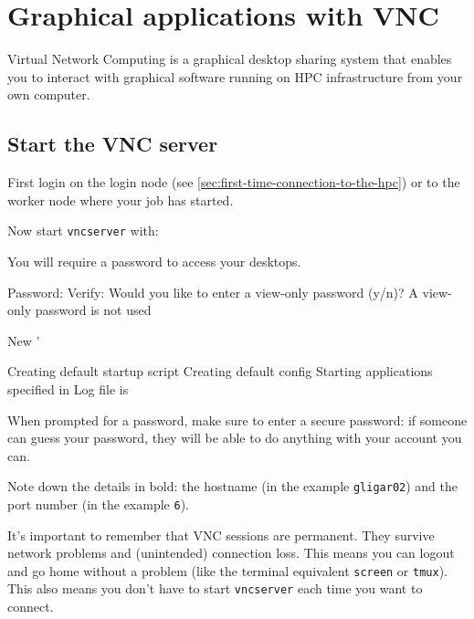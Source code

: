 \chapter{Graphical applications with VNC}
\label{ch:vnc}

Virtual Network Computing is a graphical desktop sharing system that enables you
to interact with graphical software running on HPC infrastructure from your own
computer.

\section{Start the VNC server}
\label{sec:start-vnc}

First login on the login node (see \autoref{sec:first-time-connection-to-the-hpc})
or to the worker node where your job has started. %

Now start \lstinline|vncserver| with:

\begin{prompt}
You will require a password to access your desktops.

Password:%
Verify:%
Would you like to enter a view-only password (y/n)? %
A view-only password is not used

New '%

Creating default startup script %
Creating default config %
Starting applications specified in %
Log file is %

\end{prompt}

When prompted for a password, make sure to enter a secure password: if someone
can guess your password, they will be able to do anything with your account you can.

Note down the details in bold: the hostname (in the example \lstinline|gligar02|)
and the port number (in the example \lstinline|6|).

It's important to remember that VNC sessions are permanent. They survive network
problems and (unintended) connection loss. This means you can logout and go home
without a problem (like the terminal equivalent \lstinline|screen| or \lstinline|tmux|).
This also means you don't have to start \lstinline|vncserver| each time you want to connect.


